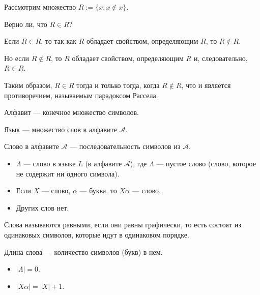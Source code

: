 
    \begin{Rem}
        Рассмотрим множество $R := \{x : x \notin x \}$. 

        Верно ли, что $R \in R$? 
        
        Если $R \in R$, то так как $R$ обладает свойством, определяющим $R$, то  $R \notin R$. 
        
        Но если $R \notin R$, то $R$ обладает свойством, определяющим $R$ и, следовательно, $R \in R$. 
        
        Таким образом, $R \in R$ тогда и только тогда, когда $R \notin R$, что и является противоречием, называемым парадоксом Рассела.
    \end{Rem}


    \begin{Def}[Алфавит]
        Алфавит --- конечное множество символов.
    \end{Def}
    
    \begin{Def}[Язык]
        Язык --- множество слов в алфавите $\mathcal{A}$.
    \end{Def}

    \begin{Def}[Слово]
        Слово в алфавите $\mathcal{A}$ --- последовательность символов из $\mathcal{A}$.

        \begin{itemize}
            \item $\Lambda$ --- слово в языке $L$ (в алфавите $\mathcal{A}$), где $\Lambda$ --- пустое слово (слово, которое не содержит ни одного символа).
            \item Если $X$ --- слово, $\alpha$ --- буква, то $X\alpha$ --- слово.
            \item Других слов нет.
        \end{itemize}
    \end{Def}

    \begin{Def}
        Слова называются равными, если они равны графически, то есть состоят из одинаковых символов, которые идут в одинаковом порядке.
    \end{Def}

    \begin{Def}
        Длина слова --- количество символов (букв) в нем.
        \begin{itemize}
            \item $|\Lambda| = 0$.
            \item $|X\alpha| = |X| + 1$.
        \end{itemize}
    \end{Def}

